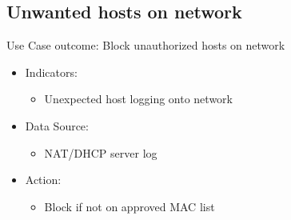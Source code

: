 \documentclass[
	letterpaper, %
	10pt, %
	unnumberedsections, %
	twoside, %
]{APAAssignment}
\begin{document}
\subsection{Unwanted hosts on network}
Use Case outcome: Block unauthorized hosts on network
\begin{spacing}{1}
	\begin{itemize}
		\item Indicators:
		      \begin{itemize}
			      \item Unexpected host logging onto network
		      \end{itemize}
		\item Data Source:
		      \begin{itemize}
			      \item NAT/DHCP server log
		      \end{itemize}
		\item Action:
		      \begin{itemize}
			      \item Block if not on approved MAC list
		      \end{itemize}
	\end{itemize}
\end{spacing}
\end{document}
